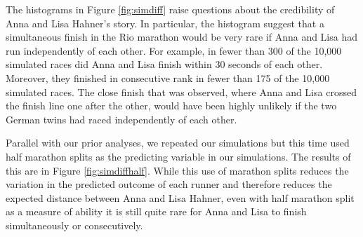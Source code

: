 \documentclass[12pt,titlepage]{article}
\begin{document}
The histograms in Figure \ref{fig:simdiff} raise questions about the
credibility of Anna and Lisa Hahner's story. In particular, the
histogram suggest that a simultaneous finish in the Rio marathon would
be very rare if Anna and Lisa had run independently of each other. For
example, in fewer than 300 of the 10,000 simulated races did Anna and
Lisa finish within 30 seconds of each other. Moreover, they finished
in consecutive rank in fewer than 175 of the 10,000 simulated races.
The close finish that was observed, where Anna and Lisa crossed the
finish line one after the other, would have been highly unlikely if
the two German twins had raced independently of each other.

Parallel with our prior analyses, we repeated our simulations but this
time used half marathon splits as the predicting variable in our
simulations. The results of this are in Figure \ref{fig:simdiffhalf}.
While this use of marathon splits reduces the variation in the
predicted outcome of each runner and therefore reduces the expected
distance between Anna and Lisa Hahner, even with half marathon split
as a measure of ability it is still quite rare for Anna and Lisa to
finish simultaneously or consecutively.
\end{document}
